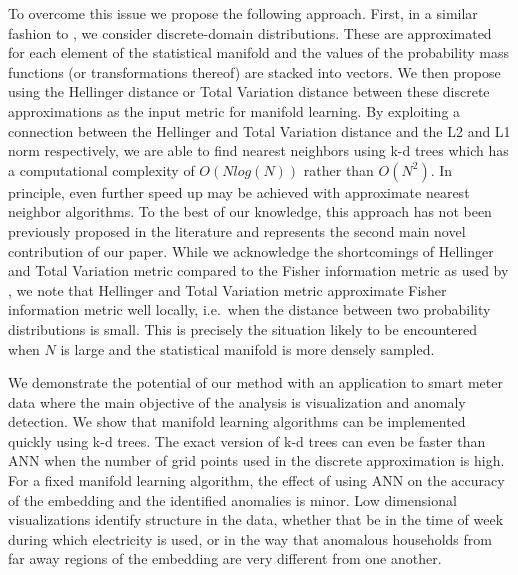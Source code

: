 \documentclass[11pt,a4paper,]{article}
\begin{document}
To overcome this issue we propose the following approach. First, in a similar fashion to \textcite{Lee2007-qa}, we consider discrete-domain distributions. These are approximated for each element of the statistical manifold and the values of the probability mass functions (or transformations thereof) are stacked into vectors. We then propose using the Hellinger distance or Total Variation distance between these discrete approximations as the input metric for manifold learning. By exploiting a connection between the Hellinger and Total Variation distance and the L2 and L1 norm respectively, we are able to find nearest neighbors using k-d trees which has a computational complexity of \(O(Nlog(N))\) rather than \(O(N^2)\). In principle, even further speed up may be achieved with approximate nearest neighbor algorithms. To the best of our knowledge, this approach has not been previously proposed in the literature and represents the second main novel contribution of our paper. While we acknowledge the shortcomings of Hellinger and Total Variation metric compared to the Fisher information metric as used by \textcite{Carter2009-ti}, we note that Hellinger and Total Variation metric approximate Fisher information metric well locally, i.e.~when the distance between two probability distributions is small. This is precisely the situation likely to be encountered when \(N\) is large and the statistical manifold is more densely sampled.

We demonstrate the potential of our method with an application to smart meter data where the main objective of the analysis is visualization and anomaly detection. We show that manifold learning algorithms can be implemented quickly using k-d trees. The exact version of k-d trees can even be faster than ANN when the number of grid points used in the discrete approximation is high. For a fixed manifold learning algorithm, the effect of using ANN on the accuracy of the embedding and the identified anomalies is minor. Low dimensional visualizations identify structure in the data, whether that be in the time of week during which electricity is used, or in the way that anomalous households from far away regions of the embedding are very different from one another.
\end{document}

